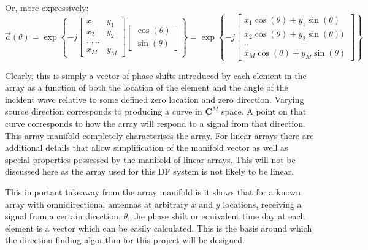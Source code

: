 Or, more expressively:
\begin{equation}
\vec{a}(\theta) = \exp \left\{ -j \begin{bmatrix} x_1 & y_1 \\ x_2 & y_2 \\ .., .. \\ x_M & y_M \end{bmatrix} \begin{bmatrix} \cos(\theta) \\ \sin(\theta) \end{bmatrix} \right\}
= \exp \left\{ -j \begin{bmatrix} x_1\cos(\theta) + y_1\sin(\theta) \\ x_2\cos(\theta) + y_2\sin(\theta)) \\ .. \\ x_M\cos(\theta) + y_M\sin(\theta) \end{bmatrix} \right\}
\end{equation}

Clearly, this is simply a vector of phase shifts introduced by each element in the array as a function of both the location of the element and the angle of the incident wave relative to some defined zero location and zero direction. 
Varying source direction corresponds to producing a curve in \(\mathbf{C}^M\) space. 
A point on that curve corresponds to how the array will respond to a signal from that direction.
This array manifold completely characterises the array\cite{dacos1995estimating}. 
For linear arrays there are additional details that allow simplification of the manifold vector as well as special properties possessed by the manifold of linear arrays.
This will not be discussed here as the array used for this DF system is not likely to be linear. 

This important takeaway from the array manifold is it shows that for a known array with omnidirectional antennas at arbitrary \(x\) and \(y\) locations, receiving a signal from a certain direction, \(\theta\), the phase shift or equivalent time day at each element is a vector which can be easily calculated. This is the basis around which the direction finding algorithm for this project will be designed. 
